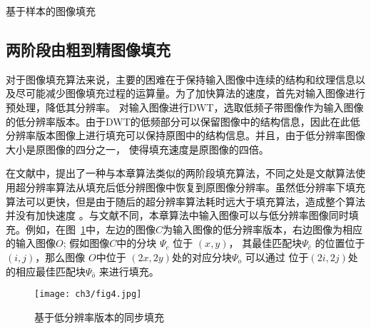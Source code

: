 \begin{algorithm}[!htbp]
\LinesNumbered
{}


\label{ch3:alg:inpainting}
\caption{基于样本的图像填充}
\end{algorithm}

\subsection{两阶段由粗到精图像填充}
\label{sec:2.2}
对于图像填充算法来说，主要的困难在于保持输入图像中连续的结构和纹理信息以及尽可能减少图像填充过程的运算量。为了加快算法的速度，首先对输入图像进行预处理，降低其分辨率。 对输入图像进行DWT，选取低频子带图像作为输入图像的低分辨率版本。由于DWT的低频部分可以保留图像中的结构信息，因此在此低分辨率版本图像上进行填充可以保持原图中的结构信息。并且，由于低分辨率图像大小是原图像的四分之一， 使得填充速度是原图像的四倍。\par
在文献中，提出了一种与本章算法类似的两阶段填充算法，不同之处是文献算法使用超分辨率算法从填充后低分辨图像中恢复到原图像分辨率。虽然低分辨率下填充算法可以更快，但是由于随后的超分辨率算法耗时远大于填充算法，造成整个算法并没有加快速度 。与文献不同，本章算法中输入图像可以与低分辨率图像同时填充。例如，在图~\ref{ch3:fig:4}中，左边的图像\(C\)为输入图像的低分辨率版本，右边图像为相应的输入图像\(O\); 假如图像\(C\)中的分块 \(\Psi_c\) 位于 \((x,y)\)， 其最佳匹配块\(\Psi_{\hat{c}}\) 的位置位于 \((i, j)\)，那么图像 \(O\)中位于 \((2x, 2y)\)处的对应分块\(\Psi_o\) 可以通过 位于\((2i, 2j)\)处的相应最佳匹配块\(\Psi_{\hat{o}}\) 来进行填充。\par
\begin{figure}[!htbp]
	\begin{center}
			\texttt{[image: ch3/fig4.jpg]}
	\end{center}
    \caption{基于低分辨率版本的同步填充}
	\label{ch3:fig:4}
\end{figure}

